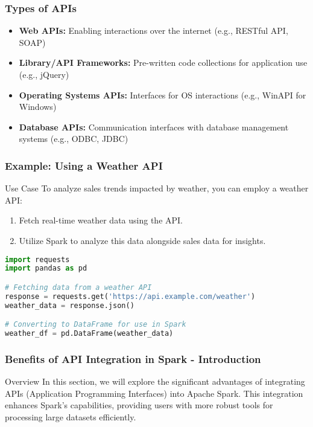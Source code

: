\documentclass[aspectratio=169]{beamer}
\begin{document}
\begin{frame}[fragile]
    \frametitle{Types of APIs}
    \begin{itemize}
        \item \textbf{Web APIs:} Enabling interactions over the internet (e.g., RESTful API, SOAP)
        \item \textbf{Library/API Frameworks:} Pre-written code collections for application use (e.g., jQuery)
        \item \textbf{Operating Systems APIs:} Interfaces for OS interactions (e.g., WinAPI for Windows)
        \item \textbf{Database APIs:} Communication interfaces with database management systems (e.g., ODBC, JDBC)
    \end{itemize}
\end{frame}

\begin{frame}[fragile]
    \frametitle{Example: Using a Weather API}
    \begin{block}{Use Case}
        To analyze sales trends impacted by weather, you can employ a weather API:
        \begin{enumerate}
            \item Fetch real-time weather data using the API.
            \item Utilize Spark to analyze this data alongside sales data for insights.
        \end{enumerate}
    \end{block}
    
    \begin{lstlisting}[language=Python]
import requests
import pandas as pd

# Fetching data from a weather API
response = requests.get('https://api.example.com/weather')
weather_data = response.json()

# Converting to DataFrame for use in Spark
weather_df = pd.DataFrame(weather_data)
    \end{lstlisting}
\end{frame}

\begin{frame}[fragile]
    \frametitle{Benefits of API Integration in Spark - Introduction}
    \begin{block}{Overview}
        In this section, we will explore the significant advantages of integrating APIs (Application Programming Interfaces) into Apache Spark. This integration enhances Spark's capabilities, providing users with more robust tools for processing large datasets efficiently.
    \end{block}
\end{frame}
\end{document}
